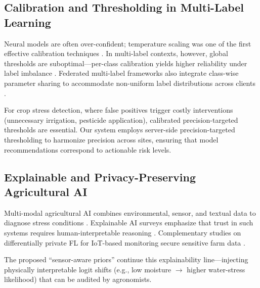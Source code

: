 \documentclass[10pt,journal,compsoc]{IEEEtran}
\begin{document}
\subsection{Calibration and Thresholding in Multi-Label Learning}

Neural models are often over-confident; temperature scaling was one of the first effective calibration techniques \cite{guo2017calibration}. In multi-label contexts, however, global thresholds are suboptimal---per-class calibration yields higher reliability under label imbalance \cite{zhang2023calibration}. Federated multi-label frameworks also integrate class-wise parameter sharing to accommodate non-uniform label distributions across clients \cite{ghosh2020efficient}.

For crop stress detection, where false positives trigger costly interventions (unnecessary irrigation, pesticide application), calibrated precision-targeted thresholds are essential. Our system employs server-side precision-targeted thresholding to harmonize precision across sites, ensuring that model recommendations correspond to actionable risk levels.

\subsection{Explainable and Privacy-Preserving Agricultural AI}

Multi-modal agricultural AI combines environmental, sensor, and textual data to diagnose stress conditions \cite{sun2023federated, zhang2022attention}. Explainable AI surveys emphasize that trust in such systems requires human-interpretable reasoning \cite{chen2023explainable}. Complementary studies on differentially private FL for IoT-based monitoring secure sensitive farm data \cite{he2021differentially}.

The proposed ``sensor-aware priors'' continue this explainability line---injecting physically interpretable logit shifts (e.g., low moisture $\rightarrow$ higher water-stress likelihood) that can be audited by agronomists.
\end{document}
